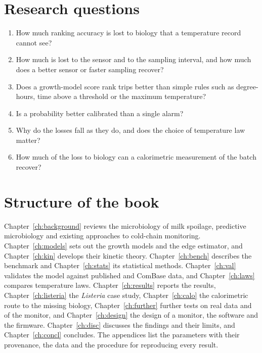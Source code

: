 \documentclass[11pt,a4paper,twoside,openany]{book}
\theoremstyle{plain}\newtheorem{proposition}{Proposition}\newtheorem{corollary}{Corollary}
\theoremstyle{definition}\newtheorem{definition}{Definition}[chapter]
\begin{document}
\section{Research questions}
\begin{enumerate}[label=RQ\arabic*.,leftmargin=3em]
\item How much ranking accuracy is lost to biology that a temperature record cannot see?
\item How much is lost to the sensor and to the sampling interval, and how much does a better sensor or faster sampling recover?
\item Does a growth-model score rank trips better than simple rules such as degree-hours, time above a threshold or the maximum temperature?
\item Is a probability better calibrated than a single alarm?
\item Why do the losses fall as they do, and does the choice of temperature law matter?
\item How much of the loss to biology can a calorimetric measurement of the batch recover?
\end{enumerate}

\section{Structure of the book}
Chapter~\ref{ch:background} reviews the microbiology of milk spoilage, predictive microbiology and existing approaches to cold-chain monitoring. Chapter~\ref{ch:models} sets out the growth models and the edge estimator, and Chapter~\ref{ch:kin} develops their kinetic theory. Chapter~\ref{ch:bench} describes the benchmark and Chapter~\ref{ch:stats} its statistical methods. Chapter~\ref{ch:val} validates the model against published and ComBase data, and Chapter~\ref{ch:laws} compares temperature laws. Chapter~\ref{ch:results} reports the results, Chapter~\ref{ch:listeria} the \textit{Listeria} case study, Chapter~\ref{ch:calo} the calorimetric route to the missing biology, Chapter~\ref{ch:further} further tests on real data and of the monitor, and Chapter~\ref{ch:design} the design of a monitor, the software and the firmware. Chapter~\ref{ch:disc} discusses the findings and their limits, and Chapter~\ref{ch:concl} concludes. The appendices list the parameters with their provenance, the data and the procedure for reproducing every result.

\end{document}
